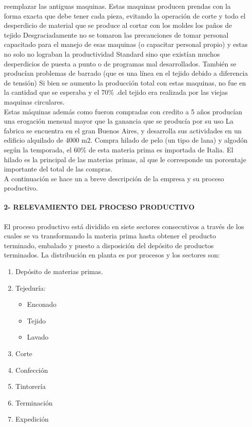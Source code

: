 \documentclass[a4paper,12pt,titlepage]{article}
\begin{document}
reemplazar las antiguas maquinas. Estas maquinas producen prendas con la forma
exacta que debe tener cada pieza, evitando la operaci\'{o}n de corte y todo el
desperdicio de material que se produce al cortar con los moldes los pa\~nos de tejido
Desgraciadamente no se tomaron las precauciones de tomar personal capacitado
para el manejo de esas maquinas (o capacitar personal propio) y estas no solo no
lograban la productividad Standard sino que exist\'{i}an muchos desperdicios de
puesta a punto o de programas mal desarrollados. Tambi\'{e}n se produc\'{i}an
problemas de barrado (que es una l\'{i}nea en el tejido debido a diferencia de tensi\'{o}n)
Si bien se aumento la producci\'{o}n total con estas maquinas, no fue en la cantidad
que se esperaba y el 70\% .del tejido era realizada por las viejas maquinas
circulares.\\
Estas m\'{a}quinas adem\'{a}s como fueron compradas con credito a 5 a\~nos produc\'{i}an
una erogaci\'{o}n mensual mayor que la ganancia que se produc\'{i}a por su uso
La fabrica se encuentra en el gran Buenos Aires, y desarrolla sus actividades en un
edificio alquilado de 4000 m2. Compra hilado de pelo (un tipo de lana) y algod\'{o}n
seg\'{u}n la temporada, el 60\% de esta materia prima es importada de Italia. El hilado
es la principal de las materias primas, al que le corresponde un porcentaje
importante del total de las compras.\\ 
A continuaci\'{o}n se hace un a breve descripci\'{o}n de la empresa y su proceso
productivo.\\ \\

\textbf{2- RELEVAMIENTO DEL PROCESO PRODUCTIVO}\\ \\
El proceso productivo est\'{a} dividido en siete sectores consecutivos a trav\'{e}s de los
cuales se va transformando la materia prima hasta obtener el producto terminado,
embalado y puesto a disposici\'{o}n del dep\'{o}sito de productos terminados. La
distribuci\'{o}n en planta es por procesos y los sectores son:\\

\begin{enumerate}
 \item Dep\'{o}sito de materias primas.
 \item Tejedur\'{i}a: 
\begin{itemize}
 \item Enconado
 \item Tejido
 \item Lavado
\end{itemize}
 \item Corte
 \item Confecci\'{o}n
 \item Tintorer\'{i}a
 \item Terminaci\'{o}n
 \item Expedici\'{o}n
\end{enumerate}
\end{document}
